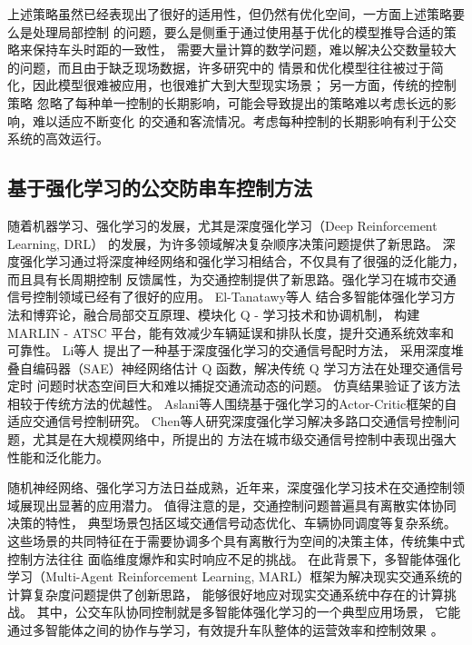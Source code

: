 上述策略虽然已经表现出了很好的适用性，但仍然有优化空间，一方面上述策略要么是处理局部控制
的问题，要么是侧重于通过使用基于优化的模型推导合适的策略来保持车头时距的一致性，
需要大量计算的数学问题，难以解决公交数量较大的问题，而且由于缺乏现场数据，许多研究中的
情景和优化模型往往被过于简化，因此模型很难被应用，也很难扩大到大型现实场景；
另一方面，传统的控制策略
忽略了每种单一控制的长期影响，可能会导致提出的策略难以考虑长远的影响，难以适应不断变化
的交通和客流情况。考虑每种控制的长期影响有利于公交系统的高效运行。
\subsection{基于强化学习的公交防串车控制方法}

随着机器学习、强化学习的发展，尤其是深度强化学习（Deep Reinforcement Learning, DRL）
的发展，为许多领域解决复杂顺序决策问题提供了新思路。
深度强化学习通过将深度神经网络和强化学习相结合，不仅具有了很强的泛化能力，而且具有长周期控制
反馈属性，为交通控制提供了新思路。强化学习在城市交通信号控制领域已经有了很好的应用\cite{kuyer2008multiagent}。
El-Tanatawy等人\cite{el2013multiagent}
结合多智能体强化学习方法和博弈论，融合局部交互原理、模块化 Q - 学习技术和协调机制，
构建 MARLIN - ATSC 平台，能有效减少车辆延误和排队长度，提升交通系统效率和可靠性。
Li等人\cite{li2016traffic}
提出了一种基于深度强化学习的交通信号配时方法，
采用深度堆叠自编码器（SAE）神经网络估计 Q 函数，解决传统 Q 学习方法在处理交通信号定时
问题时状态空间巨大和难以捕捉交通流动态的问题。
仿真结果验证了该方法相较于传统方法的优越性。
Aslani等人\cite{aslani2017adaptive}围绕基于强化学习的Actor-Critic框架的自适应交通信号控制研究。
Chen等人\cite{chen2020toward}研究深度强化学习解决多路口交通信号控制问题，尤其是在大规模网络中，所提出的
方法在城市级交通信号控制中表现出强大性能和泛化能力。

随机神经网络、强化学习方法日益成熟，近年来，深度强化学习技术在交通控制领域展现出显著的应用潜力。
值得注意的是，交通控制问题普遍具有离散实体协同决策的特性，
典型场景包括区域交通信号动态优化、车辆协同调度等复杂系统。
这些场景的共同特征在于需要协调多个具有离散行为空间的决策主体，传统集中式控制方法往往
面临维度爆炸和实时响应不足的挑战。
在此背景下，多智能体强化学习（Multi-Agent Reinforcement Learning, MARL）框架为解决现实交通系统的计算复杂度问题提供了创新思路，
能够很好地应对现实交通系统中存在的计算挑战。
其中，公交车队协同控制就是多智能体强化学习的一个典型应用场景，
它能通过多智能体之间的协作与学习，有效提升车队整体的运营效率和控制效果 。

